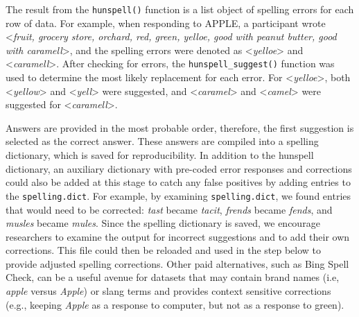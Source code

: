\documentclass[man]{apa6}
\newenvironment{Shaded}{\begin{snugshade}}{\end{snugshade}}
\newcommand{\CommentTok}[1]{\textcolor[rgb]{0.56,0.35,0.01}{\textit{#1}}}
\newcommand{\DataTypeTok}[1]{\textcolor[rgb]{0.13,0.29,0.53}{#1}}
\newcommand{\KeywordTok}[1]{\textcolor[rgb]{0.13,0.29,0.53}{\textbf{#1}}}
\newcommand{\NormalTok}[1]{#1}
\newcommand{\OperatorTok}[1]{\textcolor[rgb]{0.81,0.36,0.00}{\textbf{#1}}}
\newcommand{\StringTok}[1]{\textcolor[rgb]{0.31,0.60,0.02}{#1}}
\begin{document}
\scriptsize

\begin{Shaded}
\end{Shaded}

\normalsize

The result from the \texttt{hunspell()} function is a list object of spelling errors for each row of data. For example, when responding to APPLE, a participant wrote \textless{}\emph{fruit, grocery store, orchard, red, green, yelloe, good with peanut butter, good with caramell}\textgreater{}, and the spelling errors were denoted as \textless{}\emph{yelloe}\textgreater{} and \textless{}\emph{caramell}\textgreater{}. After checking for errors, the \texttt{hunspell\_suggest()} function was used to determine the most likely replacement for each error. For \textless{}\emph{yelloe}\textgreater{}, both \textless{}\emph{yellow}\textgreater{} and \textless{}\emph{yell}\textgreater{} were suggested, and \textless{}\emph{caramel}\textgreater{} and \textless{}\emph{camel}\textgreater{} were suggested for \textless{}\emph{caramell}\textgreater{}.

Answers are provided in the most probable order, therefore, the first suggestion is selected as the correct answer. These answers are compiled into a spelling dictionary, which is saved for reproducibility. In addition to the hunspell dictionary, an auxiliary dictionary with pre-coded error responses and corrections could also be added at this stage to catch any false positives by adding entries to the \texttt{spelling.dict}. For example, by examining \texttt{spelling.dict}, we found entries that would need to be corrected: \emph{tast} became \emph{tacit}, \emph{frends} became \emph{fends}, and \emph{musles} became \emph{mules}. Since the spelling dictionary is saved, we encourage researchers to examine the output for incorrect suggestions and to add their own corrections. This file could then be reloaded and used in the step below to provide adjusted spelling corrections. Other paid alternatives, such as Bing Spell Check, can be a useful avenue for datasets that may contain brand names (i.e, \emph{apple} versus \emph{Apple}) or slang terms and provides context sensitive corrections (e.g., keeping \emph{Apple} as a response to computer, but not as a response to green).
\end{document}
